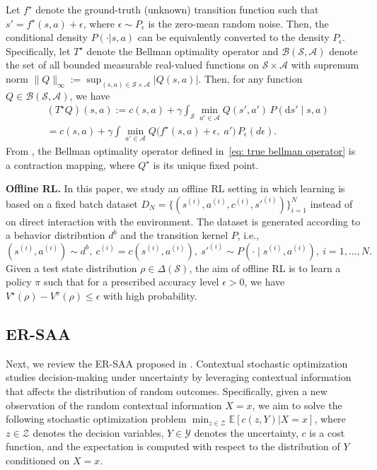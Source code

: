 \documentclass[letterpaper, 10 pt, conference]{ieeeconf}  %
\begin{document}
Let $f^\star$ denote the ground-truth (unknown) transition function such that $s' = f^\star(s,a) + \epsilon$, where $\epsilon\sim P_{\epsilon}$ is the zero-mean random noise. Then, the conditional density $P(\cdot|s,a)$ can be equivalently converted to the density $P_{\epsilon}$. Specifically, let $ T^\star$ denote the Bellman optimality operator and $\mathcal B(\mathcal S,\mathcal A)$ denote the set of all bounded measurable real-valued functions on $\mathcal S \times \mathcal A$ with supremum norm $\|Q\|_\infty := \sup_{(s,a) \in \mathcal S \times \mathcal A} |Q(s,a)|$. Then, for any function $Q \in \mathcal B(\mathcal S,\mathcal A)$, we have
\begin{align}\label{eq: true bellman operator}
&(T^\star Q)(s,a)
:= c(s,a)
+ \gamma \int_{\mathcal{S}}
\min_{a'\in\mathcal{A}} Q(s',a')\,
P(\mathrm{d}s'\mid s,a)\nonumber\\
&=
c(s,a)
+\gamma \int \min_{a' \in \mathcal A} Q\bigl(f^\star(s,a)+\epsilon,\; a'\bigr)\,P_{\epsilon}(d\epsilon).
\end{align}
From \cite{puterman2014markov}, the Bellman optimality operator defined in\ \eqref{eq: true bellman operator} is a contraction mapping, where $Q^\star$ is its unique fixed point. 

\noindent\textbf{Offline RL.}
In this paper, we study an offline RL setting in which learning is based on a fixed batch dataset $D_N=\{(s^{(i)},a^{(i)},c^{(i)},s'^{(i)})\}_{i=1}^N$ instead of on direct interaction with the environment. The dataset is generated according to a behavior distribution $d^b$ and the transition kernel $P$, i.e., $(s^{(i)},a^{(i)})\sim d^b,\ c^{(i)}=c(s^{(i)},a^{(i)}),\ s'^{(i)}\sim P(\cdot\mid s^{(i)},a^{(i)}),\ i=1,\dots,N.$ Given a test state distribution $\rho\in\Delta(\mathcal S)$, the aim of offline RL is to learn a policy $\pi$ such that for a prescribed accuracy level $\epsilon>0$, we have $V^\star(\rho)-V^\pi(\rho)\le \epsilon$ with high probability. 

\subsection{ER-SAA}
Next, we review the ER-SAA proposed in \cite{kannan2025data}. Contextual stochastic optimization studies decision-making under uncertainty by leveraging contextual information that affects the distribution of random outcomes. Specifically, given a new observation of the random contextual information $X = x$, we aim to solve the following stochastic optimization problem $\min_{z \in \mathcal Z} \mathbb E[c(z,Y)|X=x]$, where $z \in \mathcal Z$ denotes the decision variables, $Y \in \mathcal Y$ denotes the uncertainty, $c$ is a cost function, and the expectation is computed with respect to the distribution of $Y$ conditioned on $X=x$.
\end{document}
